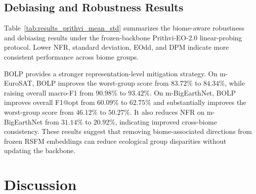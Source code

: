 \documentclass[10pt,twocolumn,letterpaper]{article}
\begin{document}





\subsection{Debiasing and Robustness Results}

Table~\ref{tab:results_prithvi_mean_std} summarizes the biome-aware robustness and debiasing results under the frozen-backbone Prithvi-EO-2.0 linear-probing protocol. Lower NFR, standard deviation, EOdd, and DPM indicate more consistent performance across biome groups.





BOLP provides a stronger representation-level mitigation strategy. On m-EuroSAT, BOLP improves the worst-group score from $83.72\%$ to $84.34\%$, while raising overall macro-F1 from $90.98\%$ to $93.42\%$. On m-BigEarthNet, BOLP improves overall F1@opt from $60.09\%$ to $62.75\%$ and substantially improves the worst-group score from $46.12\%$ to $50.27\%$. It also reduces NFR on m-BigEarthNet from $31.14\%$ to $20.92\%$, indicating improved cross-biome consistency. These results suggest that removing biome-associated directions from frozen RSFM embeddings can reduce ecological group disparities without updating the backbone.







\section{Discussion}
\end{document}
